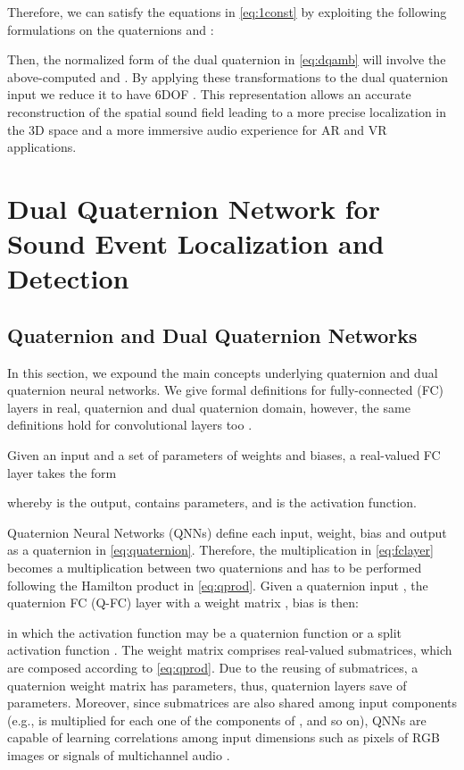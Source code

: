 \documentclass[3p, preprint, twocolumn]{elsarticle}
\begin{document}
\noindent Therefore, we can satisfy the equations in \eqref{eq:1const} by exploiting the following formulations on the quaternions  and :





\noindent Then, the normalized form of the dual quaternion in \eqref{eq:dqamb} will involve the above-computed  and .
By applying these transformations to the dual quaternion input we reduce it to have 6DOF \cite{McCarthyDualQ1990}. This representation allows an accurate reconstruction of the spatial sound field leading to a more precise localization in the 3D space and a more immersive audio experience for AR and VR applications.


\section{Dual Quaternion Network for Sound Event Localization and Detection}
\label{sec:method}

\subsection{Quaternion and Dual Quaternion Networks}

In this section, we expound the main concepts underlying quaternion and dual quaternion neural networks. We give formal definitions for fully-connected (FC) layers in real, quaternion and dual quaternion domain, however, the same definitions hold for convolutional layers too \cite{GrassucciICASSP2021, GrassucciQGAN2021}.

Given an input  and a set of parameters  of weights and  biases, a real-valued FC layer takes the form



\noindent whereby  is the output,  contains  parameters, and  is the activation function.

Quaternion Neural Networks (QNNs) define each input, weight, bias and output as a quaternion in \eqref{eq:quaternion}. Therefore, the multiplication  in \eqref{eq:fclayer} becomes a multiplication between two quaternions and has to be performed following the Hamilton product in \eqref{eq:qprod}. Given a quaternion input , the quaternion FC (Q-FC) layer with a weight matrix , bias  is then:



\noindent in which the activation function  may be a quaternion function or a split activation function \cite{GrassucciQGAN2021}. The weight matrix  comprises real-valued submatrices, which are composed according to \eqref{eq:qprod}. Due to the reusing of submatrices, a quaternion weight matrix has  parameters, thus, quaternion layers save  of parameters. Moreover, since submatrices are also shared among input components (e.g.,  is multiplied for each one of the components of , and so on), QNNs are capable of learning correlations among input dimensions such as pixels of RGB images or signals of multichannel audio \cite{ComminielloICASSP2019b}.
\end{document}
